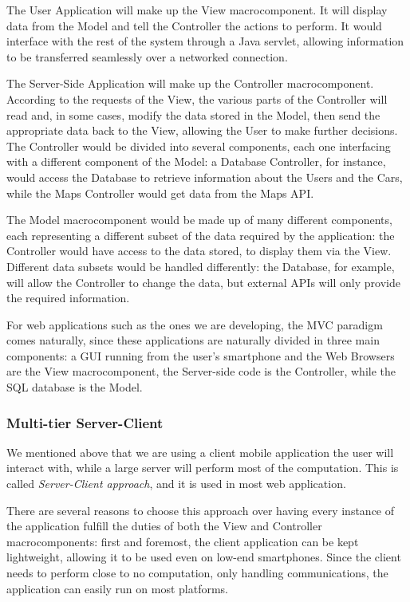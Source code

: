\documentclass[12pt]{article}
\begin{document}
The User Application will make up the View macrocomponent. It will display data from the Model and tell the Controller the actions to perform. It would interface with the rest of the system through a Java servlet, allowing information to be transferred seamlessly over a networked connection.

The Server-Side Application will make up the Controller macrocomponent. According to the requests of the View, the various parts of the Controller will read and, in some cases, modify the data stored in the Model, then send the appropriate data back to the View, allowing the User to make further decisions. The Controller would be divided into several components, each one interfacing with a different component of the Model: a Database Controller, for instance, would access the Database to retrieve information about the Users and the Cars, while the Maps Controller would get data from the Maps API.

The Model macrocomponent would be made up of many different components, each representing a different subset of the data required by the application: the Controller would have access to the data stored, to display them via the View. Different data subsets would be handled differently: the Database, for example, will allow the Controller to change the data, but external APIs will only provide the required information.

For web applications such as the ones we are developing, the MVC paradigm comes naturally, since these applications are naturally divided in three main components: a GUI running from the user's smartphone and the Web Browsers are the View macrocomponent, the Server-side code is the Controller, while the SQL database is the Model.

\subsubsection{Multi-tier Server-Client}
We mentioned above that we are using a client mobile application the user will interact with, while a large server will perform most of the computation. This is called \emph{Server-Client approach}, and it is used in most web application.

There are several reasons to choose this approach over having every instance of the application fulfill the duties of both the View and Controller macrocomponents: first and foremost, the client application can be kept lightweight, allowing it to be used even on low-end smartphones. Since the client needs to perform close to no computation, only handling communications, the application can easily run on most platforms.
\end{document}

